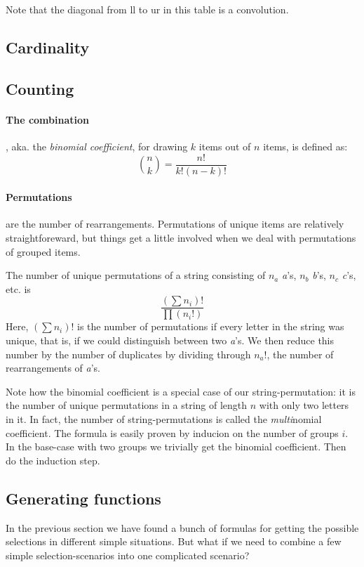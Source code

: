Note that the diagonal from ll to ur in this table is a convolution. 

\subsection{Cardinality}


\subsection{Counting}

\paragraph{The combination}, aka. the \emph{binomial coefficient}, for drawing $k$ items out of $n$ items,  is defined as: 
$$ \binom{n}{k} = \frac{ n! }{ k!(n-k)! }$$

\paragraph{Permutations} are the number of rearrangements. Permutations of unique items are relatively straightforeward, but things get a little involved when we deal with permutations of grouped items. 

The number of unique permutations of a string consisting of $n_a$ \emph{a}'s, $n_b$ \emph{b}'s, $n_c$ \emph{c}'s, etc. is 
$$ \frac{( \sum n_i )!}{\prod (n_i !)} $$
Here, $( \sum n_i )! $ is the number of permutations if every letter in the string was unique, that is, if we could distinguish between two \emph{a}'s. We then reduce this number by the number of duplicates by dividing through $n_a !$, the number of rearrangements of \emph{a}'s.

Note how the binomial coefficient is a special case of our string-permutation: it is the number of unique permutations in a string of length $n$ with only two letters in it. 
In fact, the number of string-permutations is called the \emph{multi}nomial coefficient. The formula is easily proven by inducion on the number of groups $i$. In the base-case with two groups we trivially get the binomial coefficient. Then do the induction step. 



\subsection{Generating functions}

In the previous section we have found a bunch of formulas for getting the possible selections in different simple situations. But what if we need to combine a few simple selection-scenarios into one complicated scenario? 

